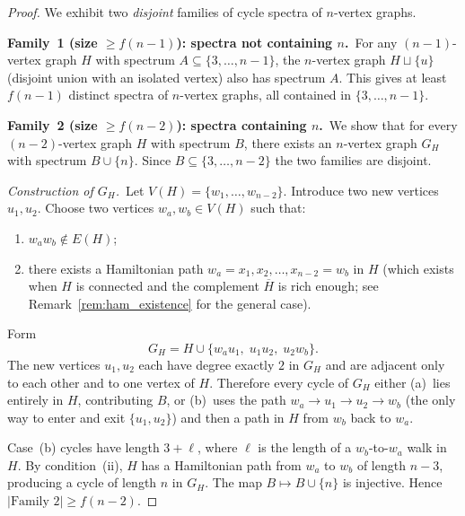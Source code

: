 \documentclass[11pt]{amsart}
\begin{document}
\begin{proof}
We exhibit two \emph{disjoint} families of cycle spectra of $n$-vertex graphs.

\medskip
\noindent\textbf{Family~1 (size $\ge f(n-1)$): spectra not containing $n$.}\
For any $(n-1)$-vertex graph $H$ with spectrum $A\subseteq\{3,\ldots,n-1\}$, the
$n$-vertex graph $H\sqcup\{u\}$ (disjoint union with an isolated vertex) also has
spectrum $A$.  This gives at least $f(n-1)$ distinct spectra of $n$-vertex graphs,
all contained in $\{3,\ldots,n-1\}$.

\medskip
\noindent\textbf{Family~2 (size $\ge f(n-2)$): spectra containing $n$.}\
We show that for every $(n-2)$-vertex graph $H$ with spectrum $B$, there exists
an $n$-vertex graph $G_{H}$ with spectrum $B\cup\{n\}$.  Since $B\subseteq
\{3,\ldots,n-2\}$ the two families are disjoint.

\medskip
\noindent\textit{Construction of $G_H$.}\
Let $V(H)=\{w_1,\ldots,w_{n-2}\}$.  Introduce two new vertices $u_1,u_2$.  Choose
two vertices $w_a,w_b\in V(H)$ such that:
\begin{enumerate}
  \item[(i)] $w_a w_b\notin E(H)$;
  \item[(ii)] there exists a Hamiltonian path $w_a = x_1, x_2, \ldots, x_{n-2}=w_b$
    in $H$ (which exists when $H$ is connected and the complement $\overline{H}$
    is rich enough; see Remark~\ref{rem:ham_existence} for the general case).
\end{enumerate}
Form
\[
  G_H = H \cup \{w_a u_1,\; u_1 u_2,\; u_2 w_b\}.
\]
The new vertices $u_1,u_2$ each have degree exactly $2$ in $G_H$ and are adjacent only
to each other and to one vertex of $H$.  Therefore every cycle of $G_H$ either
(a)~lies entirely in $H$, contributing $B$, or
(b)~uses the path $w_a\to u_1\to u_2\to w_b$ (the only way to enter and exit
$\{u_1,u_2\}$) and then a path in $H$ from $w_b$ back to $w_a$.

Case~(b) cycles have length $3+\ell$, where $\ell$ is the length of a $w_b$-to-$w_a$
walk in $H$.  By condition~(ii), $H$ has a Hamiltonian path from $w_a$ to $w_b$ of
length $n-3$, producing a cycle of length $n$ in $G_H$.  The map $B\mapsto B\cup\{n\}$
is injective.  Hence $|\text{Family~2}|\ge f(n-2)$.
\end{proof}
\end{document}
